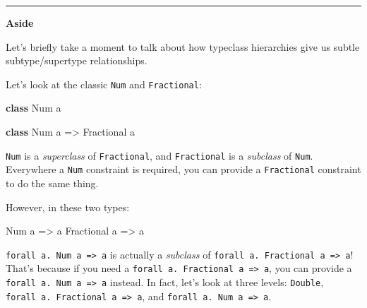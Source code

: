 \documentclass[]{article}
\newenvironment{Shaded}{}{}
\newcommand{\DataTypeTok}[1]{\textcolor[rgb]{0.56,0.13,0.00}{#1}}
\newcommand{\KeywordTok}[1]{\textcolor[rgb]{0.00,0.44,0.13}{\textbf{#1}}}
\newcommand{\NormalTok}[1]{#1}
\newcommand{\OtherTok}[1]{\textcolor[rgb]{0.00,0.44,0.13}{#1}}
\begin{document}
\begin{center}\rule{0.5\linewidth}{0.5pt}\end{center}

\textbf{Aside}

Let's briefly take a moment to talk about how typeclass hierarchies give us
subtle subtype/supertype relationships.

Let's look at the classic \texttt{Num} and \texttt{Fractional}:

\begin{Shaded}
\begin{Highlighting}[]
\KeywordTok{class} \DataTypeTok{Num}\NormalTok{ a}

\KeywordTok{class} \DataTypeTok{Num}\NormalTok{ a }\OtherTok{=\textgreater{}} \DataTypeTok{Fractional}\NormalTok{ a}
\end{Highlighting}
\end{Shaded}

\texttt{Num} is a \emph{superclass} of \texttt{Fractional}, and
\texttt{Fractional} is a \emph{subclass} of \texttt{Num}. Everywhere a
\texttt{Num} constraint is required, you can provide a \texttt{Fractional}
constraint to do the same thing.

However, in these two types:

\begin{Shaded}
\begin{Highlighting}[]
\DataTypeTok{Num}\NormalTok{ a }\OtherTok{=\textgreater{}}\NormalTok{ a}
\DataTypeTok{Fractional}\NormalTok{ a }\OtherTok{=\textgreater{}}\NormalTok{ a}
\end{Highlighting}
\end{Shaded}

\texttt{forall\ a.\ Num\ a\ =\textgreater{}\ a} is actually a \emph{subclass} of
\texttt{forall\ a.\ Fractional\ a\ =\textgreater{}\ a}! That's because if you
need a \texttt{forall\ a.\ Fractional\ a\ =\textgreater{}\ a}, you can provide a
\texttt{forall\ a.\ Num\ a\ =\textgreater{}\ a} instead. In fact, let's look at
three levels: \texttt{Double},
\texttt{forall\ a.\ Fractional\ a\ =\textgreater{}\ a}, and
\texttt{forall\ a.\ Num\ a\ =\textgreater{}\ a}.
\end{document}
